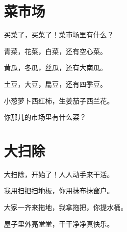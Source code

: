 \documentclass[12pt,UTF-8,openany]{ctexbook}
\begin{document}
\chapter{菜市场}

\begin{large}
    
    买菜了，买菜了！菜市场里有什么？
    
    青菜，花菜，白菜，还有空心菜。
    
    黄瓜，冬瓜，丝瓜，还有大南瓜。
    
    土豆，大豆，扁豆，还有四季豆。
    
    小葱萝卜西红柿，生姜茄子西兰花。
    
    你那儿的市场里有什么菜？
    
\end{large}


\clearpage

\begin{center}
    
    
\end{center}


\hanzibox{}\hanzibox{}\hanzibox{}\hanzibox{}\hspace{1em}\hanzibox{}\hanzibox{}\hanzibox{}\hanzibox{}

\hanzibox{}\hanzibox{}\hanzibox{}\hanzibox{}\hspace{1em}\hanzibox{}\hanzibox{}\hanzibox{}\hanzibox{}

\hanzibox{}\hanzibox{}\hanzibox{}\hanzibox{}\hspace{1em}\hanzibox{}\hanzibox{}\hanzibox{}\hanzibox{}

\hanzibox{}\hanzibox{}\hanzibox{}\hanzibox{}\hspace{1em}\hanzibox{}\hanzibox{}\hanzibox{}\hanzibox{}






\chapter{大扫除}

\begin{large}
    
    大扫除，开始了！人人动手来干活。
    
    我用扫把扫地板，你用抹布抹窗户。
    
    大家一齐来拖地，我拿拖把，你提水桶。
    
    屋子里外亮堂堂，干干净净真快乐。
    
\end{large}
\end{document}
